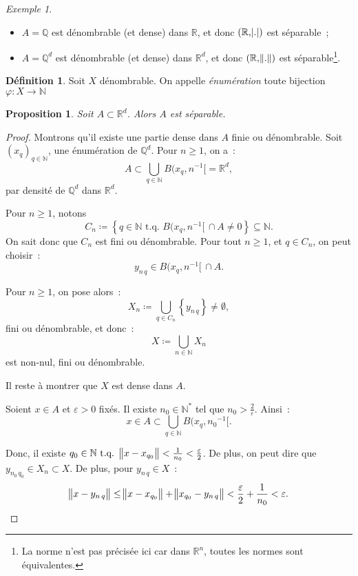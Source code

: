 \documentclass{report}
\newtheorem{prp}[thm]{Proposition}
\theoremstyle{definition}
\newtheorem{déf}[thm]{Définition}
\theoremstyle{remark}
\newtheorem{ex}{Exemple}[chapter]
\newcommand{\R}{\mathbb R}
\newcommand{\Q}{\mathbb Q}
\newcommand{\N}{\mathbb N}
\newcommand{\Ns}{\N^{*}}
\newcommand{\tq}{\text{ t.q. }}
\begin{document}
			\begin{ex}~
			\begin{itemize}
				\item $A = \Q$ est dénombrable (et dense) dans $\R$, et donc $(\R, \abs .)$ est séparable~;
				\item $A = \Q^d$ est dénombrable (et dense) dans $\R^d$, et donc $(\R, \norm .)$ est séparable\footnote{La norme n'est pas précisée ici car dans
				$\R^n$, toutes les normes sont équivalentes.}.
			\end{itemize}
			\end{ex}

			\begin{déf} Soit $X$ dénombrable. On appelle \textit{énumération} toute bijection $\varphi : X \to \N$
			\end{déf}

			\begin{prp} Soit $A \subset \R^d$. Alors $A$ est séparable.
			\end{prp}

			\begin{proof} Montrons qu'il existe une partie dense dans $A$ finie ou dénombrable. Soit $(x_q)_{q \in \N}$, une énumération de $\Q^d$. Pour $n \geq 1$,
			on a~:
			\[A \subset \bigcup_{q \in \N}B(x_q, n^{-1}[ = \R^d,\]
			par densité de $\Q^d$ dans $\R^d$.

			Pour $n \geq 1$, notons
			\[C_n \coloneqq \left\{q \in \N \tq B(x_q, n^{-1}[ \, \cap A \neq 0\right\} \subseteq \N.\]
			On sait donc que $C_n$ est fini ou dénombrable. Pour tout $n \geq 1$, et $q \in C_n$, on peut choisir~:
			\[y_{n\,q} \in B(x_q, n^{-1}[ \, \cap A.\]

			Pour $n \geq 1$, on pose alors~:
			\[X_n \coloneqq \bigcup_{q \in C_n}\left\{y_{n\,q}\right\} \neq \emptyset,\]
			fini ou dénombrable, et donc~:
			\[X \coloneqq \bigcup_{n \in \N}X_n\]
			est non-nul, fini ou dénombrable.

			Il reste à montrer que $X$ est dense dans $A$.

			Soient $x \in A$ et $\varepsilon > 0$ fixés. Il existe $n_0 \in \Ns$ tel que $n_0 > \frac 2\varepsilon$. Ainsi~:
			\[x \in A \subset \bigcup_{q \in \N}B(x_q, {n_0}^{-1}[.\]

			Donc, il existe $q_0 \in \N \tq \norm {x-x_{q_0}} < \frac 1{n_0} < \frac \varepsilon2$. De plus, on peut dire que $y_{n_0\,q_0} \in X_n \subset X$.
			De plus, pour $y_{n\,q} \in X$~:
			\[\norm {x-y_{n\,q}} \leq \norm {x-x_{q_0}} + \norm {x_{q_0} - y_{n\,q}} < \frac \varepsilon2 + \frac 1{n_0} < \varepsilon.\]
			\end{proof}
\end{document}
